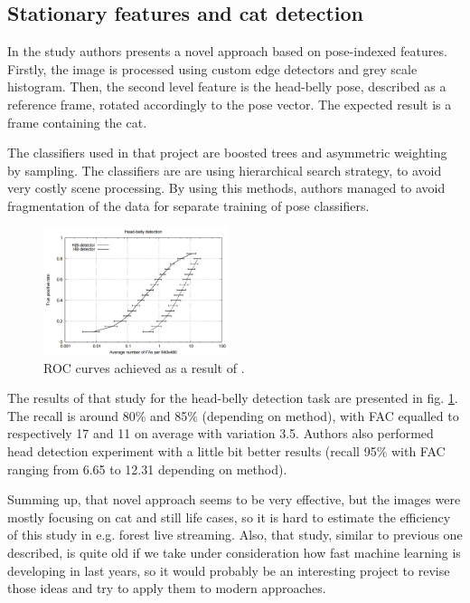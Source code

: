 \documentclass[hyperref]{acmtrans2e}
\begin{document}
\subsection{Stationary features and cat detection}
In the study \cite{features:2007} authors presents a novel approach based on pose-indexed features. Firstly, the image is processed using custom edge detectors and grey scale histogram. Then, the second level feature is the head-belly pose, described as a reference frame, rotated accordingly to the pose vector. The expected result is a frame containing the cat.

The classifiers used in that project are boosted trees and asymmetric weighting by sampling. The classifiers are are using hierarchical search strategy, to avoid very costly scene processing. By using this methods, authors managed to avoid fragmentation of the data for separate training of pose classifiers. 

\begin{figure}
\centering
    \includegraphics[width=0.48\textwidth]{roc_features}
  \caption{ROC curves achieved as a result of \protect\cite{features:2007}.}
  \label{fig:roc_features}
\end{figure}

The results of that study for the head-belly detection task are presented in fig. \ref{fig:roc_features}. The recall is around 80\% and 85\% (depending on method), with FAC equalled to respectively 17 and 11 on average with variation 3.5. Authors also performed head detection experiment with a little bit better results (recall 95\% with FAC ranging from 6.65 to 12.31 depending on method).

Summing up, that novel approach seems to be very effective, but the images were mostly focusing on cat and still life cases, so it is hard to estimate the efficiency of this study in e.g. forest live streaming. Also, that study, similar to previous one described, is quite old if we take under consideration how fast machine learning is developing in last years, so it would probably be an interesting project to revise those ideas and try to apply them to modern approaches. 
\end{document}
